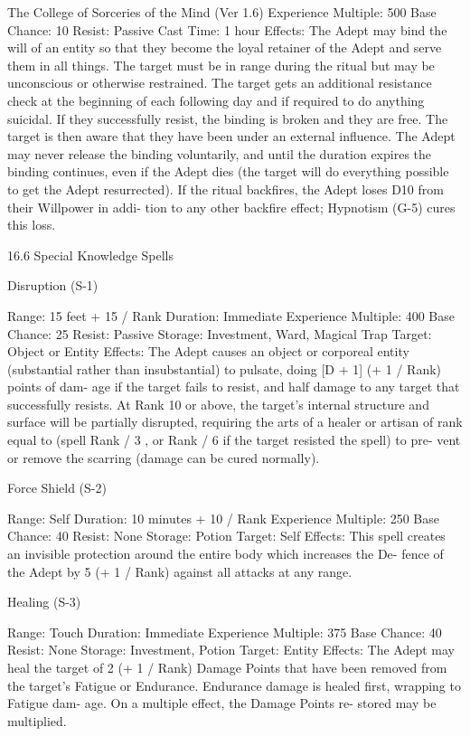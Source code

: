 \begin{Chapter}{The College of Sorceries of the Mind (Ver 1.6)}
Experience Multiple: 500 
Base Chance: 10%
Resist: Passive 
Cast Time: 1 hour 
Effects:  The  Adept  may  bind  the  will  of  an  entity 
so that they become the loyal retainer of the Adept 
and serve them in all things. The target must be in 
range  during  the  ritual  but  may  be  unconscious  or 
otherwise  restrained.  The  target  gets  an  additional 
resistance check at the beginning of each following 
day and if required to do anything suicidal. If they 
successfully  resist,  the  binding  is  broken  and  they 
are  free.  The  target  is  then  aware  that  they  have 
been  under  an  external  influence.  The  Adept  may 
never release the binding voluntarily, and until the 
duration  expires the binding  continues,  even  if the 
Adept  dies  (the  target  will  do  everything  possible 
to get the Adept resurrected). If the ritual backfires, 
the Adept loses D10 from their Willpower in addi-
tion to any other backfire effect; Hypnotism (G-5) 
cures this loss. 

16.6 Special Knowledge Spells 

Disruption (S-1) 

Range: 15 feet + 15 / Rank 
Duration: Immediate 
Experience Multiple: 400 
Base Chance: 25%
Resist: Passive 
Storage: Investment, Ward, Magical Trap 
Target: Object or Entity 
Effects:  The  Adept  causes  an  object  or  corporeal 
entity  (substantial  rather  than  insubstantial)  to 
pulsate, doing [D + 1] (+ 1 / Rank) points of dam-
age  if  the  target  fails  to  resist,  and half  damage  to 
any  target  that  successfully  resists.  At  Rank  10  or 
above,  the  target’s  internal  structure  and  surface 
will  be  partially  disrupted,  requiring  the  arts  of  a 
healer  or  artisan  of  rank  equal  to  (spell  Rank  /  3 , 
or  Rank  /  6  if  the  target  resisted  the  spell)  to  pre-
vent or remove the scarring (damage can be cured 
normally). 

Force Shield (S-2) 

Range: Self 
Duration: 10 minutes + 10 / Rank 
Experience Multiple: 250 
Base Chance: 40%
Resist: None 
Storage: Potion 
Target: Self 
Effects:  This  spell  creates  an  invisible  protection 
around  the  entire  body  which  increases  the  De-
fence  of  the  Adept  by  5  (+  1  /  Rank)  against  all 
attacks at any range. 

Healing (S-3) 

Range: Touch 
Duration: Immediate 
Experience Multiple: 375 
Base Chance: 40%
Resist: None 
Storage: Investment, Potion 
Target: Entity 
Effects:  The  Adept  may  heal  the target  of  2  (+ 1 / 
Rank)  Damage  Points  that  have  been  removed 
from the target’s Fatigue or Endurance. Endurance 
damage  is  healed  first,  wrapping  to  Fatigue  dam-
age.  On  a  multiple  effect,  the  Damage  Points  re-
stored may be multiplied. 


\end{Chapter}
